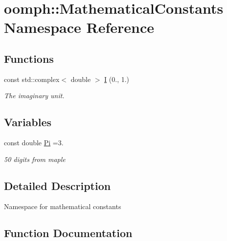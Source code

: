 \hypertarget{namespaceoomph_1_1MathematicalConstants}{}\section{oomph\+:\+:Mathematical\+Constants Namespace Reference}
\label{namespaceoomph_1_1MathematicalConstants}
\subsection*{Functions}
\begin{DoxyCompactItemize}
\item 
const std\+::complex$<$ double $>$ \hyperlink{namespaceoomph_1_1MathematicalConstants_ab1bdf76b799abcbe4fdf6eea118bba5d}{I} (0., 1.)
\begin{DoxyCompactList}\small\item\em The imaginary unit. \end{DoxyCompactList}\end{DoxyCompactItemize}
\subsection*{Variables}
\begin{DoxyCompactItemize}
\item 
const double \hyperlink{namespaceoomph_1_1MathematicalConstants_a61ae4ddbc59fbd0797ebb671e48c8d6d}{Pi} =3.
\begin{DoxyCompactList}\small\item\em 50 digits from maple \end{DoxyCompactList}\end{DoxyCompactItemize}


\subsection{Detailed Description}
Namespace for mathematical constants 

\subsection{Function Documentation}
\mbox{\label{namespaceoomph_1_1MathematicalConstants_ab1bdf76b799abcbe4fdf6eea118bba5d}} 
